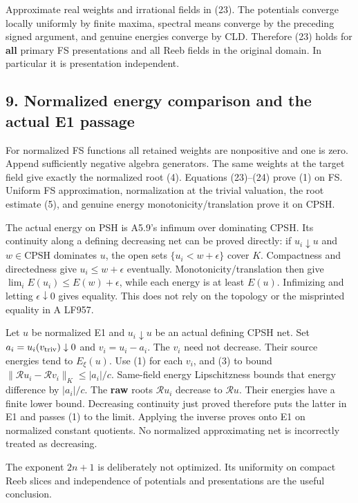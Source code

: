 \documentclass[
  11pt,
]{article}
\begin{document}
Approximate real weights and irrational fields in (23). The potentials
converge locally uniformly by finite maxima, spectral means converge by
the preceding signed argument, and genuine energies converge by CLD.
Therefore (23) holds for \textbf{all} primary FS presentations and all
Reeb fields in the original domain. In particular it is presentation
independent.

\subsection{9. Normalized energy comparison and the actual E1
passage}\label{normalized-energy-comparison-and-the-actual-e1-passage}

For normalized FS functions all retained weights are nonpositive and one
is zero. Append sufficiently negative algebra generators. The same
weights at the target field give exactly the normalized root (4).
Equations (23)--(24) prove (1) on FS. Uniform FS approximation,
normalization at the trivial valuation, the root estimate (5), and
genuine energy monotonicity/translation prove it on CPSH.

The actual energy on PSH is A5.9's infimum over dominating CPSH. Its
continuity along a defining decreasing net can be proved directly: if
\(u_i\downarrow u\) and \(w\in\mathrm{CPSH}\) dominates \(u\), the open
sets \(\{u_i<w+\epsilon\}\) cover \(K\). Compactness and directedness
give \(u_i\leq w+\epsilon\) eventually. Monotonicity/translation then
give \(\lim_iE(u_i)\leq E(w)+\epsilon\), while each energy is at least
\(E(u)\). Infimizing and letting \(\epsilon\downarrow0\) gives equality.
This does not rely on the topology or the misprinted equality in A
LF957.

Let \(u\) be normalized E1 and \(u_i\downarrow u\) be an actual defining
CPSH net. Set \(a_i=u_i(v_{\rm triv})\downarrow0\) and \(v_i=u_i-a_i\).
The \(v_i\) need not decrease. Their source energies tend to
\(E_\xi(u)\). Use (1) for each \(v_i\), and (3) to bound
\(\|\mathcal R u_i-\mathcal R v_i\|_K\leq |a_i|/c\). Same-field energy
Lipschitzness bounds that energy difference by \(|a_i|/c\). The
\textbf{raw} roots \(\mathcal R u_i\) decrease to \(\mathcal R u\).
Their energies have a finite lower bound. Decreasing continuity just
proved therefore puts the latter in E1 and passes (1) to the limit.
Applying the inverse proves onto E1 on normalized constant quotients. No
normalized approximating net is incorrectly treated as decreasing.

The exponent \(2n+1\) is deliberately not optimized. Its uniformity on
compact Reeb slices and independence of potentials and presentations are
the useful conclusion.
\end{document}
